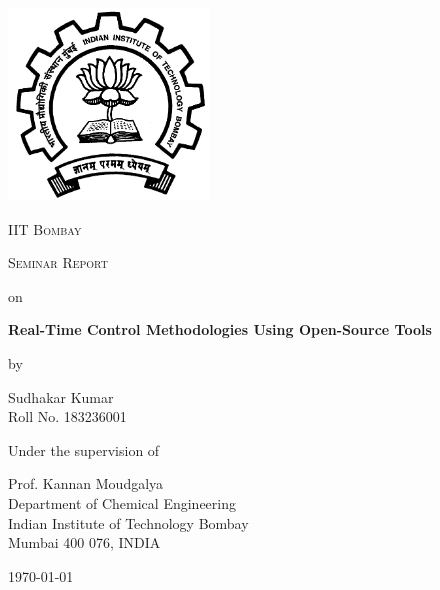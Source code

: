 \documentclass[12pt]{report}
\begin{document}


\begin{titlepage}
	\centering
	\includegraphics[width=0.4\textwidth]{images/iitb1.png}\par\vspace{1cm}
	{\scshape\LARGE IIT Bombay \par}
	\vspace{1cm}
	{\scshape\Large Seminar Report\par}
	\vspace{0.5cm}
	{\Large on \par}
	\vspace{0.5cm}
	{\huge\bfseries Real-Time Control Methodologies Using Open-Source Tools\par}
	\vspace{0.5cm}
	{\Large by \par}
	\vspace{0.5cm}
	{\Large Sudhakar Kumar \\ Roll No. 183236001 \par}
	\vfill
	\large{Under the supervision of}\par
	\Large{Prof. Kannan Moudgalya \\ Department of Chemical Engineering \\ Indian Institute of Technology Bombay \\ Mumbai 400 076, INDIA}

	\vfill

	{\large \today\par}
\end{titlepage}
\tableofcontents
\listoffigures
\end{document}
